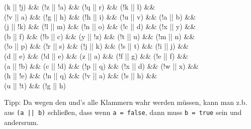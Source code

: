 \documentclass{../../sheet}
\begin{document}
\begin{enumerate}
\begin{enumerate}
\begin{ausgabe}
{                            (k || !j) \&\&
                            (!z || !a) \&\&
                            (!q || r) \&\&
                            (!k || l) \&\&\\
                            (!v || a) \&\&
                            (!g || h) \&\&
                            (!h || i) \&\&
                            (!u || v) \&\&
                            (!a || b) \&\&\\
                            (j || !k) \&\&
                            (!l || m) \&\&
                            (!n || o) \&\&
                            (!c || d) \&\&
                            (!x || y) \&\&\\
                            (b || f) \&\&
                            (!b || c) \&\&
                            (y || !z) \&\&
                            (!t || u) \&\&
                            (!m || n) \&\&\\
                            (!o || p) \&\&
                            (!r || s) \&\&
                            (!j || k) \&\&
                            (!s || t) \&\&
                            (!i || j) \&\&\\
                            (d || e) \&\&
                            (!d || e) \&\&
                            (z || a) \&\&
                            (!f || g) \&\&
                            (!e || f) \&\&\\
                            (a || !b) \&\&
                            (c || !d) \&\&
                            (!p || q) \&\&
                            (!x || d) \&\&
                            (!w || x) \&\&\\
                            (h || !e) \&\&
                            (!n || q) \&\&
                            (!v || a) \&\&
                            (!s || h) \&\&\\
                            (u || !t) \&\&
                            (!g || h)}
                    \end{ausgabe} %
                    Tipp: Da wegen den und's alle Klammern wahr werden müssen, kann man z.b. aus \texttt{(a || b)} schließen, dass wenn \texttt{a = false}, dann muss \texttt{b = true} sein und andersrum.\\
          \end{enumerate}
\end{enumerate}
\end{document}
